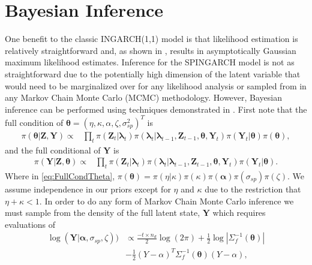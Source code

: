 \documentclass[11pt]{isuthesis}
\begin{document}
\section{Bayesian Inference}\label{Sec:Bayes}
One benefit to the classic INGARCH(1,1) model is that likelihood estimation is relatively straightforward and, as shown in \cite{fokianos2009poisson}, results in asymptotically Gaussian maximum likelihood estimates.  Inference for the SPINGARCH model is not as straightforward due to the potentially high dimension of the latent variable that would need to be marginalized over for any likelihood analysis or sampled from in any Markov Chain Monte Carlo (MCMC) methodology.  However, Bayesian inference can be performed using techniques demonstrated in \cite{joseph}. First note that the full condition of $\boldsymbol{\boldsymbol{\theta}}=\left(\eta,\kappa,\alpha,\zeta,\sigma^2_{sp}\right)^T$ is
\begin{align}
\pi(\boldsymbol{\theta} | \boldsymbol{Z},\boldsymbol{Y})\propto &  \prod_t\pi(\boldsymbol{Z}_t|\boldsymbol{\lambda}_t)\pi(\boldsymbol{\lambda}_t|\boldsymbol{\lambda}_{t-1},\boldsymbol{Z}_{t-1},\boldsymbol{\theta},\boldsymbol{Y}_t)\pi(\boldsymbol{Y}_t|\boldsymbol{\theta})
\pi(\boldsymbol{\boldsymbol{\theta}})\label{eq:FullCondTheta},
\end{align}
and the full conditional of $\boldsymbol{Y}$ is
\begin{align}
\pi(\boldsymbol{Y} | \boldsymbol{Z},\boldsymbol{\theta})\propto &  \prod_t\pi(\boldsymbol{Z}_t|\boldsymbol{\lambda}_t)\pi(\boldsymbol{\lambda}_t|\boldsymbol{\lambda}_{t-1},\boldsymbol{Z}_{t-1},\boldsymbol{\theta},\boldsymbol{Y}_t)\pi(\boldsymbol{Y}_t|\boldsymbol{\theta}).
\end{align}
Where in \eqref{eq:FullCondTheta}, $\pi(\boldsymbol{\theta})=\pi(\eta|\kappa)\pi(\kappa)\pi(\boldsymbol{\alpha})\pi(\sigma_{sp})\pi(\zeta)$.  We assume independence in our priors except for $\eta$ and $\kappa$ due to the restriction that $\eta+\kappa <1$.  In order to do any form of Markov Chain Monte Carlo inference we must sample from the density of the full latent state, $\boldsymbol{Y}$ which requires evaluations of 
\begin{align}
\log(\boldsymbol{Y}|\boldsymbol{\alpha},\sigma_{sp},\zeta)) & \propto \frac{-t \times n_d}{2}\log(2 \pi) + \frac{1}{2} \log | \Sigma_f^{-1}(\boldsymbol{\theta})|\nonumber\\
& - \frac{1}{2}(Y-\alpha)^T\Sigma_f^{-1}(\boldsymbol{\theta})(Y-\alpha) \label{eq:log Y1},
\end{align}
\end{document}

